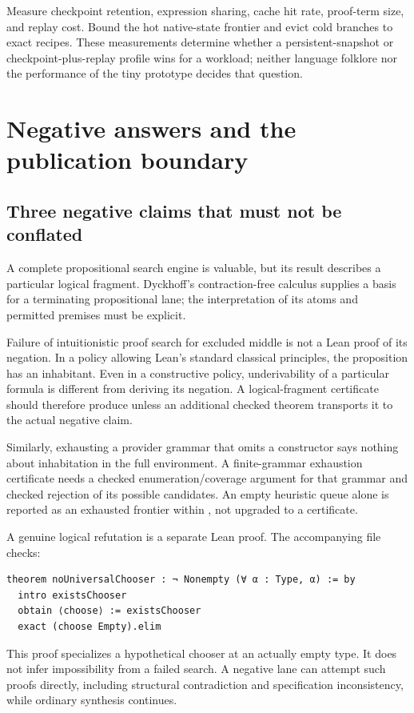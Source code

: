 Measure checkpoint retention, expression sharing, cache hit rate, proof-term size, and replay cost. Bound the hot native-state frontier and evict cold branches to exact recipes. These measurements determine whether a persistent-snapshot or checkpoint-plus-replay profile wins for a workload; neither language folklore nor the performance of the tiny prototype decides that question.

\section{Negative answers and the publication boundary}
\label{sec:trust}
\subsection{Three negative claims that must not be conflated}
A complete propositional search engine is valuable, but its result describes a particular logical fragment. Dyckhoff's contraction-free calculus supplies a basis for a terminating propositional lane; the interpretation of its atoms and permitted premises must be explicit.\cite{dyckhoff,djex}

Failure of intuitionistic proof search for excluded middle is not a Lean proof of its negation. In a policy allowing Lean's standard classical principles, the proposition has an inhabitant. Even in a constructive policy, underivability of a particular formula is different from deriving its negation. A logical-fragment certificate should therefore produce  unless an additional checked theorem transports it to the actual negative claim.

Similarly, exhausting a provider grammar that omits a constructor says nothing about inhabitation in the full environment. A finite-grammar exhaustion certificate needs a checked enumeration/coverage argument for that grammar and checked rejection of its possible candidates. An empty heuristic queue alone is reported as an exhausted frontier within , not upgraded to a certificate.

A genuine logical refutation is a separate Lean proof. The accompanying file checks:
\begin{lstlisting}[caption={Checked actual non-inhabitation proof.}]
theorem noUniversalChooser : ¬ Nonempty (∀ α : Type, α) := by
  intro existsChooser
  obtain ⟨choose⟩ := existsChooser
  exact (choose Empty).elim
\end{lstlisting}
This proof specializes a hypothetical chooser at an actually empty type. It does not infer impossibility from a failed search. A negative lane can attempt such proofs directly, including structural contradiction and specification inconsistency, while ordinary synthesis continues.

